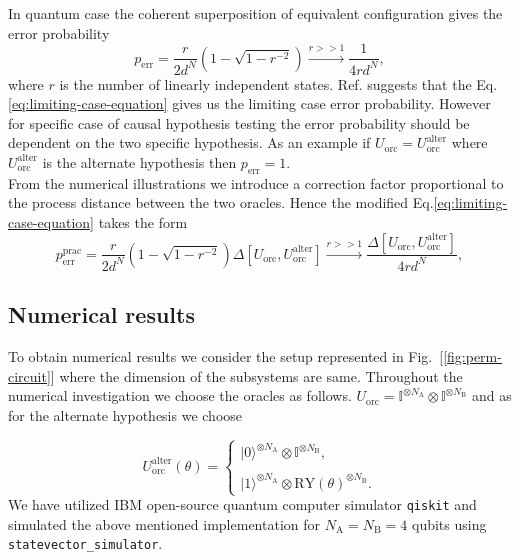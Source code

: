 In quantum case the coherent superposition of equivalent configuration gives the error probability \cite{chiribella2019quantum}
\begin{equation}
    p_\textrm{err} = \frac{r}{2d^N}\left( 1-\sqrt{1-r^{-2}} \right) \xrightarrow[]{r>>1}\frac{1}{4rd^N},\label{eq:limiting-case-equation}
\end{equation}
where $r$ is the number of linearly independent states. Ref.\cite{chiribella2019quantum} suggests that the Eq.\eqref{eq:limiting-case-equation} gives us the limiting case error probability. However for specific case of causal hypothesis testing the error probability should be dependent on the two specific hypothesis. As an example if $U_\textrm{orc} = U_\textrm{orc}^\textrm{alter}$ where $U_\textrm{orc}^\textrm{alter}$ is the alternate hypothesis then $p_\textrm{err} =1$.\\
From the numerical illustrations we introduce a correction factor proportional to the process distance between the two oracles. Hence the modified Eq.\eqref{eq:limiting-case-equation} takes the form
\begin{equation}
    p_\textrm{err}^\textrm{prac} = \frac{r}{2d^N}\left( 1-\sqrt{1-r^{-2}} \right)\Delta\left[U_\textrm{orc}, U_\textrm{orc}^\textrm{alter}\right] \xrightarrow[]{r>>1}\frac{\Delta\left[U_\textrm{orc}, U_\textrm{orc}^\textrm{alter}\right]}{4rd^N},\label{eq:practical-case-equation}
\end{equation}
\subsection{Numerical results}
To obtain numerical results we consider the setup represented in Fig.~[\ref{fig:perm-circuit}] where the dimension of the subsystems are same. Throughout the numerical investigation we choose the oracles as follows. $U_\textrm{orc} = \mathbb{I}^{\otimes N_\textrm{A}}\otimes \mathbb{I}^{\otimes N_\textrm{B}}$ and as for the alternate hypothesis we choose

\begin{equation}
        U_\textrm{orc}^\textrm{alter}(\theta)= 
        \begin{cases}
        \lvert0\rangle^{\otimes N_\textrm{A}} \otimes \mathbb{I}^{\otimes N_\textrm{B}}, \\\\
        \lvert1\rangle^{\otimes N_\textrm{A}} \otimes \textrm{RY}(\theta)^{\otimes N_\textrm{B}}.
        \end{cases}
        \label{eq:alternate-hypothesis}
    \end{equation}
We have utilized IBM open-source
quantum computer simulator \texttt{qiskit} and simulated the above mentioned implementation for $N_\textrm{A} = N_\textrm{B} = 4$ qubits using \texttt{statevector\_simulator}. 

